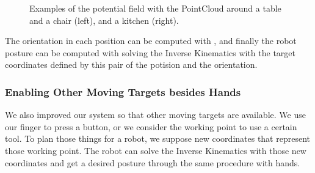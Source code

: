 \begin{figure}[htbp]
\begin{center}
\begin{minipage}{0.45\hsize}
\begin{center}
        \label{figure:kitchen_potential}
      \end{center}
    \end{minipage}
  \end{center}
  \vspace{-3mm}
  \caption{\footnotesize{Examples of the potential field with the PointCloud around a table and a chair (left), and a kitchen (right).}}
  \vspace{-3mm}
\end{figure}

The orientation in each position can be computed with , and finally the robot posture can be computed with solving the Inverse Kinematics with the target coordinates defined by this pair of the potision and the orientation.

\subsubsection{Enabling Other Moving Targets besides Hands}
We also improved our system so that other moving targets are available. We use our finger to press a button, or we consider the working point to use a certain tool. To plan those things for a robot, we suppose new coordinates that represent those working point. The robot can solve the Inverse Kinematics with those new coordinates and get a desired posture through the same procedure with hands.
